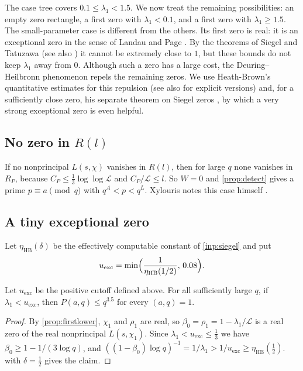 \documentclass[11pt]{amsart}
\numberwithin{equation}{section}
\theoremstyle{plain}
\theoremstyle{definition}
\theoremstyle{remark}
\newcommand{\LL}{\mathcal{L}}
\newcommand{\1}{\mathbf{1}}
\begin{document}
The case tree covers $0.1\le\lambda_1<1.5$. We now treat the remaining possibilities:
an empty zero rectangle, a first zero with $\lambda_1<0.1$, and a first zero with
$\lambda_1\ge1.5$. The small-parameter case is different from the others. Its first
zero is real: it is an exceptional zero in the sense of Landau and Page
\cite{Landau1918imaginar,Page1935number}. By the theorems of Siegel and Tatuzawa
\cite{Siegel1935classenzahl,Tatuzawa1951theorem} (see also
\cite{Pintz1977elementaryV,Pintz1977elementaryVIII}) it cannot be extremely close to $1$, but these
bounds do not keep $\lambda_1$ away from $0$. Although such a zero has a large cost, the
Deuring--Heilbronn phenomenon \cite{Deuring1933imaginare,Heilbronn1934class,Linnik1944deuring}
repels the remaining zeros. We use Heath-Brown's quantitative estimates for this repulsion (see
also \cite{BenliGoelTwissZaman2026explicit} for explicit versions) and, for a sufficiently close
zero, his separate theorem on Siegel zeros \cite{HeathBrown1990siegel}, by which a very strong
exceptional zero is even helpful.

\subsection{No zero in \texorpdfstring{$R(l)$}{R(l)}}
If no nonprincipal $L(s,\chi)$ vanishes in $R(l)$, then for large $q$ none vanishes in $R_P$, because
$C_P\le\frac13\log\log\LL$ and $C_P/\LL\le l$. So $W=0$ and \cref{prop:detect} gives a prime $p\equiv
a\pmod q$ with $q^A<p<q^L$. Xylouris notes this case himself \cite[p.~36]{Xylouris2011nullstellen}.

\subsection{A tiny exceptional zero}
Let $\eta_{\mathrm{HB}}(\delta)$ be the effectively computable constant of \cref{inp:siegel} and put
\[
  u_{\mathrm{exc}}=\min\Bigl(\frac1{\eta_{\mathrm{HB}}(1/2)},\,0.08\Bigr).
\]

\begin{proposition}\label{prop:tiny}
Let $u_{\mathrm{exc}}$ be the positive cutoff defined above. For all sufficiently large
$q$, if $\lambda_1<u_{\mathrm{exc}}$, then $P(a,q)\le q^{3.5}$ for every $(a,q)=1$.
\end{proposition}

\begin{proof}
By \cref{prop:firstlower}, $\chi_1$ and $\rho_1$ are real, so $\beta_0=\rho_1=1-\lambda_1/\LL$ is a real zero of the
real nonprincipal $L(s,\chi_1)$. Since $\lambda_1<u_{\mathrm{exc}}\le\frac13$ we have $\beta_0\ge1-1/(3\log q)$, and
$((1-\beta_0)\log q)^{-1}=1/\lambda_1>1/u_{\mathrm{exc}}\ge\eta_{\mathrm{HB}}(\frac12)$.  with $\delta=\frac12$ gives the claim.
\end{proof}
\end{document}

